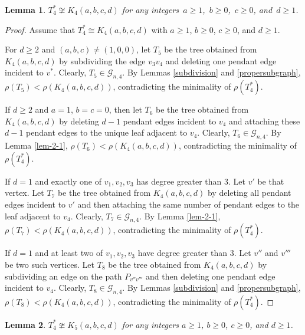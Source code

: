 \documentclass[12pt]{amsart}
\newtheorem{lem}{Lemma}[section]
\begin{document}
\begin{lem}\label{lem-3.11}
	$T_4^* \not\cong K_4(a,b,c,d)$ for any integers \(a \ge 1\), \(b \ge 0\), \(c \ge 0\), and \(d \ge 1\).
\end{lem}
\begin{proof}
	Assume that $T_4^* \cong K_4(a,b,c,d)$ with $a \ge 1$, $b \ge 0$, $c \ge 0$, and $d \ge 1$.
	
For $d \ge 2$ and $(a,b,c) \neq (1,0,0)$,  let $T_5$ be the tree obtained from $K_4(a,b,c,d)$ by subdividing the edge $v_3v_4$ and deleting one pendant edge incident to $v^*$.
	Clearly, $T_5 \in \mathcal{G}_{n,4}$.
	By Lemmas \ref{subdivision} and \ref{propersubgraph}, $\rho(T_5) < \rho(K_4(a,b,c,d))$, contradicting the minimality of $\rho(T_4^*)$.
	
	If $d \ge 2$ and $a = 1$, $b = c = 0$, then let $T_6$ be the tree obtained from $K_4(a,b,c,d)$ by deleting $d-1$ pendant edges incident to $v_4$ and attaching these $d-1$ pendant edges to the unique leaf adjacent to $v_4$.
	Clearly, $T_6 \in \mathcal{G}_{n,4}$.
	By Lemma \ref{lem-2-1}, $\rho(T_6) < \rho(K_4(a,b,c,d))$, contradicting the minimality of $\rho(T_4^*)$.
	
	If $d = 1$ and exactly one of $v_1, v_2, v_3$ has degree greater than $3$.
	Let $v'$ be that vertex.
	Let $T_7$ be the tree obtained from $K_4(a,b,c,d)$ by deleting all pendant edges incident to $v'$ and then attaching the same number of pendant edges to the leaf adjacent to $v_4$.
	Clearly, $T_7 \in \mathcal{G}_{n,4}$.
	By Lemma \ref{lem-2-1}, $\rho(T_7) < \rho(K_4(a,b,c,d))$, contradicting the minimality of $\rho(T_4^*)$.
	
	
	If $d = 1$ and at least two of $v_1, v_2, v_3$ have degree greater than $3$.
	Let $v''$ and $v'''$ be two such vertices.
	Let $T_8$ be the tree obtained from $K_4(a,b,c,d)$ by subdividing an edge on the path $P_{v''v'''}$ and then deleting one pendant edge incident to $v_4$.
	Clearly, $T_8 \in \mathcal{G}_{n,4}$.
	By Lemmas \ref{subdivision} and \ref{propersubgraph}, $\rho(T_8) < \rho(K_4(a,b,c,d))$, contradicting the minimality of $\rho(T_4^*)$.
\end{proof}


\begin{lem}\label{lem-3.12}
	$T_4^* \ncong K_5(a,b,c,d)$ for any integers $a \ge 1$, $b \ge 0$, $c \ge 0$, and $d \ge 1$.
\end{lem}
\end{document}
